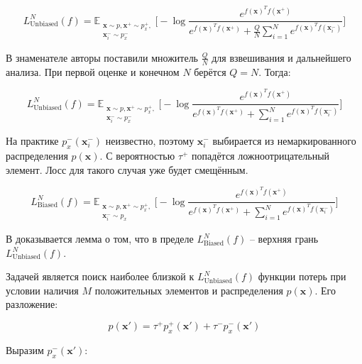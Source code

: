 \documentclass[a4paper, 12pt]{article}
\begin{document}
\begin{equation}\label{eq:101}
L_{\text{Unbiased}}^N(f) = \mathbb{E}_{\substack{\textbf{x} \sim p, \textbf{x}^+ \sim p^+_x,\\ \textbf{x}_i^- \sim p_x^-}} \bigg[-\log \frac{e^{f(\textbf{x})^T f(\textbf{x}^+)}}{e^{f(\textbf{x})^T f(\textbf{x}^+)} + \frac{Q}{N}\sum _{i=1}^N e^{f(\textbf{x})^T f(\textbf{x}_i^-)}}\bigg]
\end{equation}

В знаменателе авторы \citep{chuang2020debiased} поставили множитель $\frac{Q}{N}$ для взвешивания и дальнейшего анализа. При первой оценке и конечном $N$ берётся $Q = N$. Тогда:

\begin{equation}\label{eq:1}
L_{\text{Unbiased}}^N(f) = \mathbb{E}_{\substack{\textbf{x} \sim p, \textbf{x}^+ \sim p^+_x,\\ \textbf{x}_i^- \sim p_x^-}} \bigg[-\log \frac{e^{f(\textbf{x})^T f(\textbf{x}^+)}}{e^{f(\textbf{x})^T f(\textbf{x}^+)} + \sum _{i=1}^N e^{f(\textbf{x})^T f(\textbf{x}_i^-)}}\bigg]
\end{equation}

На практике $p_x^-(\textbf{x}_i^-)$ неизвестно, поэтому $\textbf{x}_i^-$ выбирается из немаркированного распределения $p(\textbf{x})$. С вероятностью $\tau^+$ попадётся ложноотрицательный элемент. Лосс для такого случая уже будет смещённым.

\begin{equation}\label{eq:2}
L_{\text{Biased}}^N(f) = \mathbb{E}_{\substack{\textbf{x} \sim p, \textbf{x}^+ \sim p^+_x,\\ \textbf{x}_i^- \sim p_x}} \bigg[-\log \frac{e^{f(\textbf{x})^T f(\textbf{x}^+)}}{e^{f(\textbf{x})^T f(\textbf{x}^+)} + \sum _{i=1}^N e^{f(\textbf{x})^T f(\textbf{x}_i^-)}}\bigg]
\end{equation}

В \citep{chuang2020debiased} доказывается лемма о том, что в пределе $L_{\text{Biased}}^N(f)$ -- верхняя грань $L_{\text{Unbiased}}^N(f)$.

Задачей является поиск наиболее близкой к $L_{\text{Unbiased}}^N(f)$ функции потерь при условии наличия $M$ положительных элементов и распределения $p(\mathbf{x})$. Его разложение:

\begin{equation}\label{eq:3}
p(\textbf{x}') = \tau^+ p^+_x(\textbf{x}') + \tau^-p_x^-(\textbf{x}')
\end{equation}

Выразим $p^-_x(\textbf{x}')$:
\end{document}
